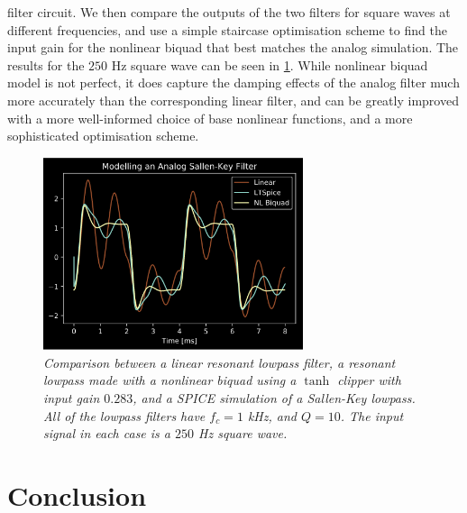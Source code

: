 \documentclass[twoside,a4paper]{article}
\begin{document}
filter circuit. We then compare the outputs of the two filters
for square waves at different frequencies, and use a simple staircase
optimisation scheme to find the input gain for the nonlinear biquad
that best matches the analog simulation. The results for the $250 \text{ Hz}$
square wave can be seen in \cref{SPICE}. While nonlinear biquad model
is not perfect, it does capture the damping effects of the analog filter
much more accurately than the corresponding linear filter, and can be greatly
improved with a more well-informed choice of base nonlinear functions, and
a more sophisticated optimisation scheme.
%
\begin{figure}[ht]
    \center
    \includegraphics[width=3in]{../Pics/Spice-Compare.png}
    \caption{\label{SPICE}{\it Comparison between a linear resonant lowpass
                            filter, a resonant lowpass made with a nonlinear biquad
                            using a $\tanh$ clipper with input gain $0.283$,
                            and a SPICE simulation of a Sallen-Key lowpass.
                            All of the lowpass filters have $f_c=1$ kHz, and
                            $Q=10$. The input signal in each case is a $250$ Hz
                            square wave.}}
\end{figure}
%

\section{Conclusion}
\end{document}
